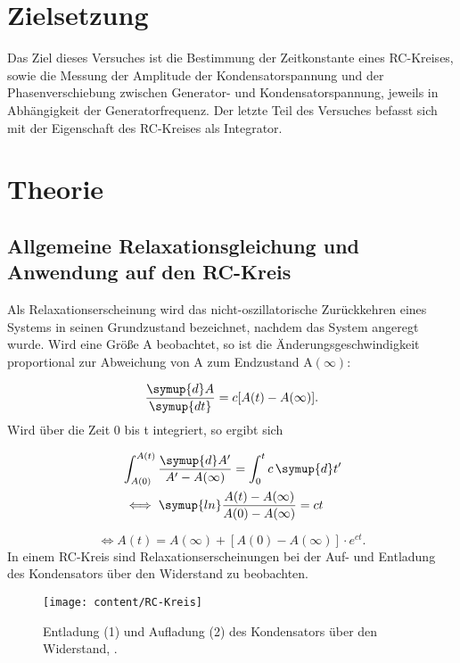 \section{Zielsetzung}
Das Ziel dieses Versuches ist die Bestimmung der Zeitkonstante eines RC-Kreises, sowie die Messung der Amplitude der Kondensatorspannung
und der Phasenverschiebung zwischen Generator- und Kondensatorspannung, jeweils in Abhängigkeit der Generatorfrequenz. Der letzte Teil des
Versuches befasst sich mit der Eigenschaft des RC-Kreises als Integrator.
\section{Theorie}

\subsection{Allgemeine Relaxationsgleichung und Anwendung auf den RC-Kreis}
Als Relaxationserscheinung wird das nicht-oszillatorische Zurückkehren eines Systems in seinen Grundzustand bezeichnet, nachdem das System 
angeregt wurde. Wird eine Größe A beobachtet, so ist die Änderungsgeschwindigkeit proportional zur Abweichung von A zum 
Endzustand $\text{A}(\infty)$:

\begin{equation*}
\frac{\symup{d}A}{\symup{dt}} = c[A(t) -A(\infty)].
\end{equation*}
Wird über die Zeit 0 bis t integriert, so ergibt sich

\begin{equation}
\begin{aligned}
&\int_{A(0)}^{A(t)} \frac{\symup{d}A'}{A' - A(\infty)} = \int_0^t c \, \symup{d}t' \\
&\iff \symup{ln} \frac{A(t) - A(\infty)}{A(0) - A(\infty)} = ct \\
\end{aligned}
\end{equation}

\begin{equation}
\iff A(t) = A(\infty) + [A(0) - A(\infty)] \cdot e^{ct}.
\label{eq:groesseA}
\end{equation}
In einem RC-Kreis sind Relaxationserscheinungen bei der Auf- und Entladung des Kondensators über den Widerstand zu beobachten.
\begin{figure}[h!]
	\centering
	\texttt{[image: content/RC-Kreis]}
	\caption{Entladung (1) und Aufladung (2) des Kondensators über den Widerstand, \cite[1]{anleitung353}.}
	\label{fig:rc-kreis}
\end{figure}
